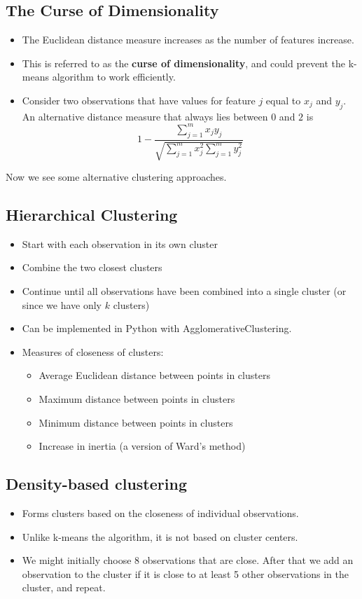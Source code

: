 \subsection{The Curse of Dimensionality}
\begin{itemize}
    \item The Euclidean distance measure increases as the number of features increase.
    \item This is referred to as the \textbf{curse of dimensionality}, and could prevent the k-means algorithm to work efficiently.
    \item Consider two observations that have values for feature $j$ equal to $x_{j}$ and $y_{j}$. An alternative distance measure that always lies between $0$ and $2$ is
          \begin{equation*}
              1-\frac{\sum _{j=1}^{m} x_{j} y_{j}}{\sqrt{\sum _{j=1}^{m} x_{j}^{2}\sum _{j=1}^{m} y_{j}^{2}}}
          \end{equation*}
\end{itemize}

Now we see some alternative clustering approaches.
\subsection{Hierarchical Clustering}
\begin{itemize}
    \item Start with each observation in its own cluster
    \item Combine the two closest clusters
    \item Continue until all observations have been combined into a single cluster (or since we have only $k$ clusters)
    \item Can be implemented in Python with AgglomerativeClustering.
    \item Measures of closeness of clusters:
          \begin{itemize}
              \item Average Euclidean distance between points in clusters
              \item Maximum distance between points in clusters
              \item Minimum distance between points in clusters
              \item Increase in inertia (a version of Ward’s method)
          \end{itemize}
\end{itemize}
\subsection{Density-based clustering}
\begin{itemize}
    \item Forms clusters based on the closeness of individual observations.
    \item Unlike k-means the algorithm, it is not based on cluster centers.
    \item We might initially choose 8 observations that are close. After that we add an observation to the cluster if it is close to at least 5 other observations in the cluster, and repeat. 
\end{itemize}
